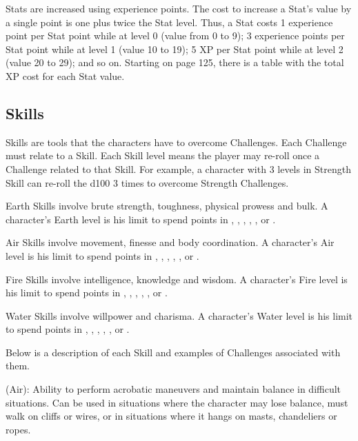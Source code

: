 \begin{multicols}{2}
Stats are increased using experience points. The cost to increase a Stat's value by a single point is one plus twice the Stat level. Thus, a Stat costs 1 experience point per Stat point while at level 0 (value from 0 to 9); 3 experience points per Stat point while at level 1 (value 10 to 19); 5 XP per Stat point while at level 2 (value 20 to 29); and so on. Starting on page 125, there is a table with the total XP cost for each Stat value. \pc
{\centering %
}%

\subsection{Skills}
\label{subsec:skills}
\begin{ffcolpage}
Skills are tools that the characters have to overcome Challenges. Each Challenge must relate to a Skill. Each Skill level means the player may re-roll once a Challenge related to that Skill. For example, a character with 3 levels in Strength Skill can re-roll the d100 3 times to overcome Strength Challenges. \pc

Earth Skills involve brute strength, toughness, physical prowess and bulk. A character's Earth level is his limit to spend points in , , , , , or . \pc

Air Skills involve movement, finesse and body coordination. A character's Air level is his limit to spend points in , , , , , or . \pc

Fire Skills involve intelligence, knowledge and wisdom. A character's Fire level is his limit to spend points in , , , , , or . \pc

Water Skills involve willpower and charisma. A character's Water level is his limit to spend points in , , , , , or .
\end{ffcolpage} \pc
Below is a description of each Skill and examples of Challenges associated with them. \pw

\begin{ffcolpage}
 (Air): Ability to perform acrobatic maneuvers and maintain balance in difficult situations. Can be used in situations where the character may lose balance, must walk on cliffs or wires, or in situations where it hangs on masts, chandeliers or ropes.
\end{ffcolpage} \pw


\end{multicols}
